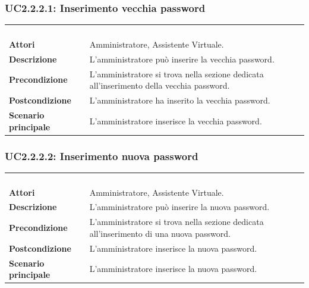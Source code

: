\subsubsection{UC2.2.2.1: Inserimento vecchia password}
\label{UC2.2.2.1}
\begin{longtable}{l|p{10cm}}
	\rowcolor[gray]{0.8} \multicolumn{2}{c}{} \\
	\rowcolor[gray]{0.8} \multicolumn{2}{c}{\textbf{UC2.2.2.1 - Inserimento vecchia password}} \\
	\rowcolor[gray]{0.8} \multicolumn{2}{c}{} \\
	\hline
	&\\
	\textbf{Attori} & Amministratore, Assistente Virtuale.\\[7pt]
	\textbf{Descrizione} & L'amministratore può inserire la vecchia password.\\[7pt]
	\textbf{Precondizione} & L'amministratore si trova nella sezione dedicata all'inserimento della vecchia password.\\[7pt]
	\textbf{Postcondizione} & L'amministratore ha inserito la vecchia password.\\[7pt]
	\textbf{Scenario principale} &L'amministratore inserisce la vecchia password.\\[7pt]\hline
\end{longtable}

\subsubsection{UC2.2.2.2: Inserimento nuova password}
\label{UC2.2.2.2}
\begin{longtable}{l|p{10cm}}
	\rowcolor[gray]{0.8} \multicolumn{2}{c}{} \\
	\rowcolor[gray]{0.8} \multicolumn{2}{c}{\textbf{UC2.2.2.2 - Inserimento nuova password}} \\
	\rowcolor[gray]{0.8} \multicolumn{2}{c}{} \\
	\hline
	&\\
	\textbf{Attori} & Amministratore, Assistente Virtuale.\\[7pt]
	\textbf{Descrizione} & L'amministratore può inserire la nuova password.\\[7pt]
	\textbf{Precondizione} & L'amministratore si trova nella sezione dedicata all'inserimento di una nuova password.\\[7pt]
	\textbf{Postcondizione} & L'amministratore inserisce la nuova password.\\[7pt]
	\textbf{Scenario principale} &L'amministratore inserisce la nuova password.\\[7pt]\hline
\end{longtable}

